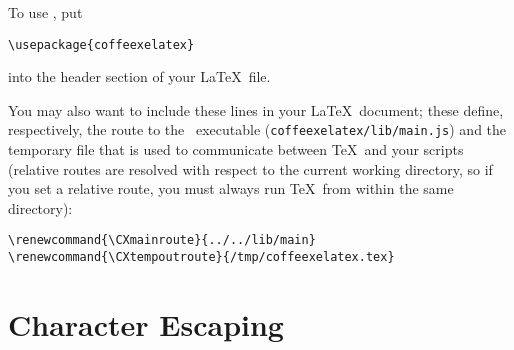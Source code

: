 \documentclass[a4paper]{article}
\makeatletter
\newenvironment{jzrplain}{%
  \lineskiplimit=-10pt%
  \lineskip=0pt%
  \topskip=0pt%
  \setlength{\parskip}{4mm}%
  \setlength{\parindent}{0mm}%
  \leading{4mm}
  }%
  {\par}
\renewcommand{\CXmainroute}{../../lib/main}
\renewcommand{\CXtempoutroute}{/tmp/CXtempout.tex}
\makeatother
\begin{document}
\begin{jzrplain}
To use \CX, put
\begin{verbatim}
\usepackage{coffeexelatex}
\end{verbatim}
into the header section of your \LaTeX\ file.

You may also want to include these lines in your \LaTeX\ document; these define, respectively, the route
to the \CX\ executable (\verb#coffeexelatex/lib/main.js#) and the temporary file that is used to communicate
between \TeX\ and your scripts (relative routes are resolved with respect to the current working directory,
so if you set a relative route, you must always run \TeX\ from within the same directory):
\begin{verbatim}
\renewcommand{\CXmainroute}{../../lib/main}
\renewcommand{\CXtempoutroute}{/tmp/coffeexelatex.tex}
\end{verbatim}










\clearpage\section{Character Escaping}\label{esc}


\end{jzrplain}
\end{document}
